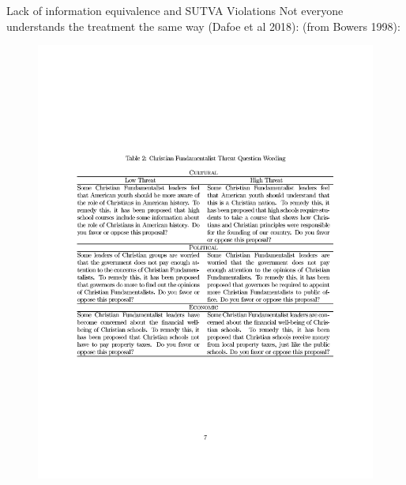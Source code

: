 \documentclass[
  ignorenonframetext,
]{beamer}
\begin{document}
\begin{frame}{Lack of information equivalence and SUTVA Violations}
\protect\hypertarget{lack-of-information-equivalence-and-sutva-violations-1}{}
Not everyone understands the treatment the same way (Dafoe et al 2018):
(from Bowers 1998):

\begin{figure}

{\centering \includegraphics[width=0.8\linewidth]{./figs/survey-exp-bowers-1998-christian-threat} 

}

\end{figure}
\end{frame}
\end{document}
